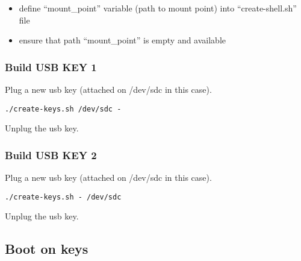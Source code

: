 \begin{itemize}
\tightlist
\item
  define ``mount\_point'' variable (path to mount point) into
  ``create-shell.sh'' file
\item
  ensure that path ``mount\_point'' is empty and available
\end{itemize}

\hypertarget{build-usb-key-1}{%
\subsubsection{Build USB KEY 1}\label{build-usb-key-1}}

Plug a new usb key (attached on /dev/sdc in this case).

\begin{verbatim}
./create-keys.sh /dev/sdc -
\end{verbatim}

Unplug the usb key.

\hypertarget{build-usb-key-2}{%
\subsubsection{Build USB KEY 2}\label{build-usb-key-2}}

Plug a new usb key (attached on /dev/sdc in this case).

\begin{verbatim}
./create-keys.sh - /dev/sdc
\end{verbatim}

Unplug the usb key.

\hypertarget{boot-on-keys}{%
\subsection{Boot on keys}\label{boot-on-keys}}

